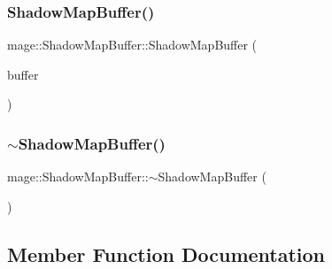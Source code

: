 \hypertarget{structmage_1_1_shadow_map_buffer_a3acb83c9c76dc9e77388b9d014894622}{}\label{structmage_1_1_shadow_map_buffer_a3acb83c9c76dc9e77388b9d014894622} 
\subsubsection{\texorpdfstring{Shadow\+Map\+Buffer()}{ShadowMapBuffer()}\hspace{0.1cm}{\footnotesize\ttfamily [4/4]}}
{\footnotesize\ttfamily mage\+::\+Shadow\+Map\+Buffer\+::\+Shadow\+Map\+Buffer (\begin{DoxyParamCaption}\item[{\hyperlink{structmage_1_1_shadow_map_buffer}{Shadow\+Map\+Buffer} \&\&}]{buffer }\end{DoxyParamCaption})\hspace{0.3cm}{\ttfamily [default]}}

\hypertarget{structmage_1_1_shadow_map_buffer_a34eedd164d45a009ddecc97c8739c80b}{}\label{structmage_1_1_shadow_map_buffer_a34eedd164d45a009ddecc97c8739c80b} 
\subsubsection{\texorpdfstring{$\sim$\+Shadow\+Map\+Buffer()}{~ShadowMapBuffer()}}
{\footnotesize\ttfamily mage\+::\+Shadow\+Map\+Buffer\+::$\sim$\+Shadow\+Map\+Buffer (\begin{DoxyParamCaption}{ }\end{DoxyParamCaption})\hspace{0.3cm}{\ttfamily [default]}}



\subsection{Member Function Documentation}
\hypertarget{structmage_1_1_shadow_map_buffer_afdae8754fb93772df3e1b975051d8cff}{}\label{structmage_1_1_shadow_map_buffer_afdae8754fb93772df3e1b975051d8cff} 
